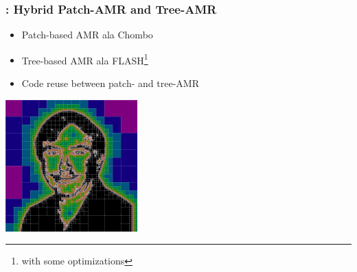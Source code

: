 \begin{frame}[fragile] \frametitle{\cello: Hybrid Patch-AMR and Tree-AMR}

\begin{minipage}{2in}
\footnotesize
\begin{itemize}
\item Patch-based AMR ala Chombo
\item Tree-based AMR ala FLASH\footnote{with some optimizations}
\item Code reuse between patch- and tree-AMR
\end{itemize}
\end{minipage}
\begin{minipage}{2.0in}
\centerline{\includegraphics[width=2.0in]{norman.png}}
\end{minipage}
\end{frame}
